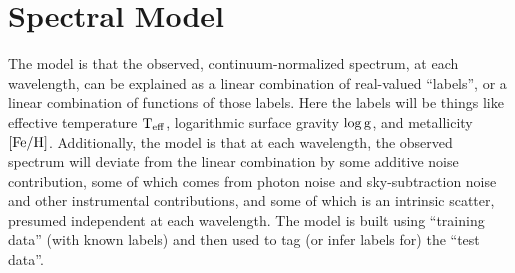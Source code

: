 \documentclass[12pt, preprint]{aastex}
\newcommand{\teff}{\mbox{$\rm T_{eff}$}}
\newcommand{\feh}{\mbox{$\rm [Fe/H]$}}
\newcommand{\logg}{\mbox{$\rm \log g$}}
\begin{document}
\section{Spectral Model}

The model is that the observed, continuum-normalized spectrum, at each
wavelength, can be explained as a linear combination of real-valued
``labels'', or a linear combination of functions of those labels.
Here the labels will be things like effective temperature $\teff$,
logarithmic surface gravity $\logg$, and metallicity $\feh$.
Additionally, the model is that at each wavelength, the observed
spectrum will deviate from the linear combination by some additive
noise contribution, some of which comes from photon noise and
sky-subtraction noise and other instrumental contributions, and some
of which is an intrinsic scatter, presumed independent at each
wavelength.
The model is built using ``training data'' (with known labels) and then
used to tag (or infer labels for) the ``test data''.
\end{document}
